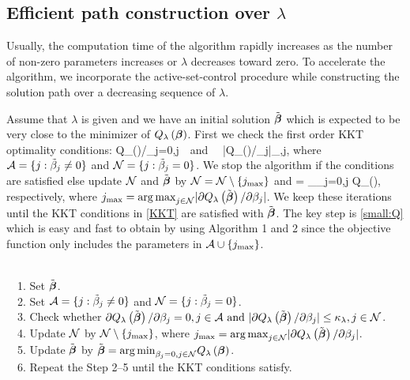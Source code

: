 \subsection{Efficient path construction over $\lambda$}
Usually, the computation time of the algorithm rapidly increases
as the number of non-zero parameters increases or $\lambda$ decreases toward zero.
To accelerate the algorithm, we incorporate the active-set-control procedure
while constructing the solution path over a decreasing sequence of $\lambda$.

Assume that $\lambda$ is given and we have an initial solution $\tilde{\mbox{\boldmath{$\beta$}}}$
which is expected to be very close to the minimizer of $Q_\lambda\left(\mbox{\boldmath{$\beta$}}\right)$.
First we check the first order KKT optimality conditions:
\beqn\label{KKT}
    \partial Q_{\lambda}\left(\tilde\bbeta\right)/\partial\beta_j=0,j\in\cA ~~\mbox{and}~~
    |\partial Q_{\lambda}\left(\tilde\bbeta\right)/\partial\beta_j|\leq \kappa_{\lambda},j\in\cN,
\eeqn
where ${\cal A}=\{j:\tilde\beta_j\neq0\}$ and ${\cal N}=\{j:\tilde\beta_j=0\}$.
We stop the algorithm if the conditions are satisfied
else update ${\cal N}$ and $\tilde{\mbox{\boldmath{$\beta$}}}$ by ${\cal N}={\cal N} \setminus\{j_{\max}\}$ and
\beqn\label{small:Q}
    \tilde\bbeta = {\arg\min}_{\beta_j=0,j\in\cN} Q_{\lambda}\left(\bbeta\right),
\eeqn
respectively, where $j_{\max}={\arg\max}_{j\in{\cal N}}|\partial Q_{\lambda}\left(\tilde{\mbox{\boldmath{$\beta$}}}\right)/\partial\beta_j|$.
We keep these iterations until the KKT conditions in \eqref{KKT} are satisfied with $\tilde{\mbox{\boldmath{$\beta$}}}$.
The key step is \eqref{small:Q}
which is easy and fast to obtain by using Algorithm 1 and 2
since the objective function only includes the parameters in ${\cal A}\cup\{j_{\max}\}$.

\medskip

\\
$~~~$ 1. Set $\tilde{\mbox{\boldmath{$\beta$}}}$.\\
$~~~$ 2. Set ${\cal A}=\{j:\tilde\beta_j\neq0\}$ and ${\cal N}=\{j:\tilde\beta_j=0\}$.\\
$~~~$ 3. Check whether
        $\partial Q_{\lambda}\left(\tilde{\mbox{\boldmath{$\beta$}}}\right)/\partial\beta_j=0,j\in{\cal A} ~\mbox{and}~
        |\partial Q_{\lambda}\left(\tilde{\mbox{\boldmath{$\beta$}}}\right)/\partial\beta_j|\leq \kappa_{\lambda},j\in{\cal N}$.\\
$~~~$ 4. Update ${\cal N}$ by ${\cal N} \setminus\{j_{\max}\}$, where $j_{\max}={\arg\max}_{j\in{\cal N}}|\partial Q_{\lambda}\left(\tilde{\mbox{\boldmath{$\beta$}}}\right)/\partial\beta_j|$.\\
$~~~$ 5. Update $\tilde{\mbox{\boldmath{$\beta$}}}$ by  $\tilde{\mbox{\boldmath{$\beta$}}} = {\arg\min}_{\beta_j=0,j\in{\cal N}} Q_{\lambda}\left(\mbox{\boldmath{$\beta$}}\right)$.\\
$~~~$ 6. Repeat the Step 2--5 until the KKT conditions satisfy.


